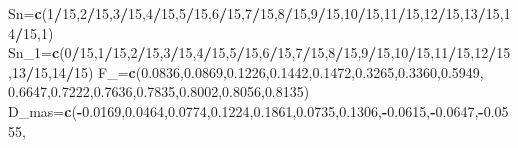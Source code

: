 \documentclass[a4paper,oneside,openany]{book}
\newenvironment{Shaded}{\begin{snugshade}}{\end{snugshade}}
\newcommand{\KeywordTok}[1]{\textcolor[rgb]{0.13,0.29,0.53}{\textbf{#1}}}
\newcommand{\DecValTok}[1]{\textcolor[rgb]{0.00,0.00,0.81}{#1}}
\newcommand{\FloatTok}[1]{\textcolor[rgb]{0.00,0.00,0.81}{#1}}
\newcommand{\OperatorTok}[1]{\textcolor[rgb]{0.81,0.36,0.00}{\textbf{#1}}}
\newcommand{\NormalTok}[1]{#1}
\begin{document}
\begin{Shaded}
\begin{Highlighting}[]
\NormalTok{Sn=}\KeywordTok{c}\NormalTok{(}\DecValTok{1}\OperatorTok{/}\DecValTok{15}\NormalTok{,}\DecValTok{2}\OperatorTok{/}\DecValTok{15}\NormalTok{,}\DecValTok{3}\OperatorTok{/}\DecValTok{15}\NormalTok{,}\DecValTok{4}\OperatorTok{/}\DecValTok{15}\NormalTok{,}\DecValTok{5}\OperatorTok{/}\DecValTok{15}\NormalTok{,}\DecValTok{6}\OperatorTok{/}\DecValTok{15}\NormalTok{,}\DecValTok{7}\OperatorTok{/}\DecValTok{15}\NormalTok{,}\DecValTok{8}\OperatorTok{/}\DecValTok{15}\NormalTok{,}\DecValTok{9}\OperatorTok{/}\DecValTok{15}\NormalTok{,}\DecValTok{10}\OperatorTok{/}\DecValTok{15}\NormalTok{,}\DecValTok{11}\OperatorTok{/}\DecValTok{15}\NormalTok{,}\DecValTok{12}\OperatorTok{/}\DecValTok{15}\NormalTok{,}\DecValTok{13}\OperatorTok{/}\DecValTok{15}\NormalTok{,}\DecValTok{14}\OperatorTok{/}\DecValTok{15}\NormalTok{,}\DecValTok{1}\NormalTok{)}
\NormalTok{Sn_}\DecValTok{1}\NormalTok{=}\KeywordTok{c}\NormalTok{(}\DecValTok{0}\OperatorTok{/}\DecValTok{15}\NormalTok{,}\DecValTok{1}\OperatorTok{/}\DecValTok{15}\NormalTok{,}\DecValTok{2}\OperatorTok{/}\DecValTok{15}\NormalTok{,}\DecValTok{3}\OperatorTok{/}\DecValTok{15}\NormalTok{,}\DecValTok{4}\OperatorTok{/}\DecValTok{15}\NormalTok{,}\DecValTok{5}\OperatorTok{/}\DecValTok{15}\NormalTok{,}\DecValTok{6}\OperatorTok{/}\DecValTok{15}\NormalTok{,}\DecValTok{7}\OperatorTok{/}\DecValTok{15}\NormalTok{,}\DecValTok{8}\OperatorTok{/}\DecValTok{15}\NormalTok{,}\DecValTok{9}\OperatorTok{/}\DecValTok{15}\NormalTok{,}\DecValTok{10}\OperatorTok{/}\DecValTok{15}\NormalTok{,}\DecValTok{11}\OperatorTok{/}\DecValTok{15}\NormalTok{,}\DecValTok{12}\OperatorTok{/}\DecValTok{15}\NormalTok{,}\DecValTok{13}\OperatorTok{/}\DecValTok{15}\NormalTok{,}\DecValTok{14}\OperatorTok{/}\DecValTok{15}\NormalTok{)}
\NormalTok{F_=}\KeywordTok{c}\NormalTok{(}\FloatTok{0.0836}\NormalTok{,}\FloatTok{0.0869}\NormalTok{,}\FloatTok{0.1226}\NormalTok{,}\FloatTok{0.1442}\NormalTok{,}\FloatTok{0.1472}\NormalTok{,}\FloatTok{0.3265}\NormalTok{,}\FloatTok{0.3360}\NormalTok{,}\FloatTok{0.5949}\NormalTok{,}
                    \FloatTok{0.6647}\NormalTok{,}\FloatTok{0.7222}\NormalTok{,}\FloatTok{0.7636}\NormalTok{,}\FloatTok{0.7835}\NormalTok{,}\FloatTok{0.8002}\NormalTok{,}\FloatTok{0.8056}\NormalTok{,}\FloatTok{0.8135}\NormalTok{)}
\NormalTok{D_mas=}\KeywordTok{c}\NormalTok{(}\OperatorTok{-}\FloatTok{0.0169}\NormalTok{,}\FloatTok{0.0464}\NormalTok{,}\FloatTok{0.0774}\NormalTok{,}\FloatTok{0.1224}\NormalTok{,}\FloatTok{0.1861}\NormalTok{,}\FloatTok{0.0735}\NormalTok{,}\FloatTok{0.1306}\NormalTok{,}\OperatorTok{-}\FloatTok{0.0615}\NormalTok{,}\OperatorTok{-}\FloatTok{0.0647}\NormalTok{,}\OperatorTok{-}\FloatTok{0.0555}\NormalTok{,}

\end{Highlighting}
\end{Shaded}
\end{document}

